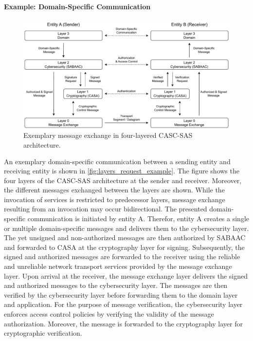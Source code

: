 \paragraph{Example: Domain-Specific Communication}
\begin{figure}
    \centering
    \includegraphics[width=1.0\linewidth]{figures/layers_request_example.drawio.pdf}
    \caption{Exemplary message exchange in four-layered CASC-SAS architecture.}
    \label{fig:layers_request_example}
\end{figure}
An exemplary domain-specific communication between a sending entity and receiving entity is shown in \autoref{fig:layers_request_example}.
The figure shows the four layers of the CASC-SAS architecture at the sender and receiver.
Moreover, the different messages exchanged between the layers are shown.
While the invocation of services is restricted to predecessor layers, message exchange resulting from an invocation may occur bidirectional.
The presented domain-specific communication is initiated by entity A.
Therefor, entity A creates a single or multiple domain-specific messages and delivers them to the cybersecurity layer.
The yet unsigned and non-authorized messages are then authorized by SABAAC and forwarded to CASA at the cryptography layer for signing.
Subsequently, the signed and authorized messages are forwarded to the receiver using the reliable and unreliable network transport services provided by the message exchange layer.
Upon arrival at the receiver, the message exchange layer delivers the signed and authorized messages to the cybersecurity layer.
The messages are then verified by the cybersecurity layer before forwarding them to the domain layer and application.
For the purpose of message verification, the cybersecurity layer enforces access control policies by verifying the validity of the message authorization.
Moreover, the message is forwarded to the cryptography layer for cryptographic verification.

